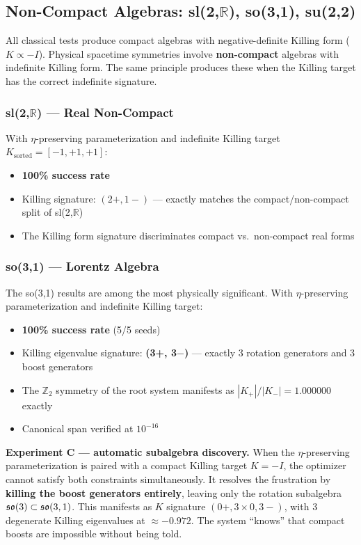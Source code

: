 \subsection{Non-Compact Algebras: sl(2,$\mathbb{R}$), so(3,1), su(2,2)}\label{sec:noncompact}

All classical tests produce compact algebras with negative-definite Killing form ($K \propto -I$). Physical spacetime symmetries involve \textbf{non-compact} algebras with indefinite Killing form. The same principle produces these when the Killing target has the correct indefinite signature.

\subsubsection{sl(2,$\mathbb{R}$) --- Real Non-Compact}

With $\eta$-preserving parameterization and indefinite Killing target $K_{\mathrm{sorted}} = [-1, +1, +1]$:

\begin{itemize}
\item \textbf{100\% success rate}
\item Killing signature: $(2+, 1-)$ --- exactly matches the compact/non-compact split of sl(2,$\mathbb{R}$)
\item The Killing form signature discriminates compact vs.\ non-compact real forms
\end{itemize}

\subsubsection{so(3,1) --- Lorentz Algebra}\label{sec:so31}

The so(3,1) results are among the most physically significant. With $\eta$-preserving parameterization and indefinite Killing target:

\begin{itemize}
\item \textbf{100\% success rate} (5/5 seeds)
\item Killing eigenvalue signature: \textbf{(3+, 3$-$)} --- exactly 3 rotation generators and 3 boost generators
\item The $\mathbb{Z}_2$ symmetry of the root system manifests as $|K_+|/|K_-| = 1.000000$ exactly
\item Canonical span verified at $10^{-16}$
\end{itemize}

\textbf{Experiment C --- automatic subalgebra discovery.} When the $\eta$-preserving parameterization is paired with a compact Killing target $K = -I$, the optimizer cannot satisfy both constraints simultaneously. It resolves the frustration by \textbf{killing the boost generators entirely}, leaving only the rotation subalgebra $\mathfrak{so}(3) \subset \mathfrak{so}(3,1)$. This manifests as $K$ signature $(0+, 3 \times 0, 3-)$, with 3 degenerate Killing eigenvalues at $\approx -0.972$. The system ``knows'' that compact boosts are impossible without being told.

